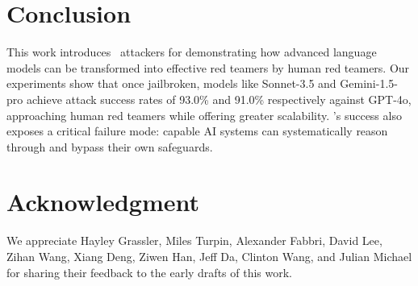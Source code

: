 \section{Conclusion}\label{sec:conclusion}

This work introduces \methodname~attackers for demonstrating how advanced language models can be transformed into effective red teamers by human red teamers. Our experiments show that once jailbroken, models like Sonnet-3.5 and Gemini-1.5-pro achieve attack success rates of 93.0\% and 91.0\% respectively against GPT-4o, approaching human red teamers while offering greater scalability. \methodname's success also exposes a critical failure mode: capable AI systems can systematically reason through and bypass their own safeguards. 


\section*{Acknowledgment}

We appreciate Hayley Grassler, Miles Turpin, Alexander Fabbri, David Lee, Zihan Wang, Xiang Deng, Ziwen Han, Jeff Da, Clinton Wang, and Julian Michael for sharing their feedback to the early drafts of this work.